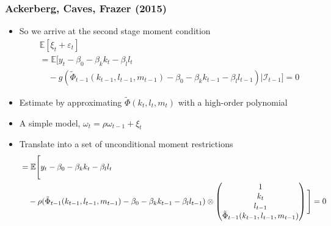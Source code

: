 \documentclass{beamer}
\begin{document}
\begin{frame}
\frametitle{Ackerberg, Caves, Frazer (2015)}
\begin{itemize}
	\item So we arrive at the second stage moment condition
	\begin{equation}
		\begin{split}
			&\mathbb{E}[\xi_{t}+\varepsilon_{t}]\\
			&=\mathbb{E}[y_{t}-\beta_{0}-\beta_{k}k_{t}-\beta_{l}l_{t}\\
			& \quad -g(\tilde{\Phi}_{t-1}(k_{t-1}, l_{t-1}, m_{t-1})-\beta_{0}-\beta_{k}k_{t-1}-\beta_{l}l_{t-1})|\mathcal{I}_{t-1}]=0
		\end{split}
	\end{equation}
	\item Estimate by approximating $\tilde{\Phi}(k_{t}, l_{t}, m_{t})$ with a high-order polynomial
	\item A simple model, $\omega_{t}=\rho \omega_{t-1}+\xi_{t}$
	\item Translate into a set of unconditional moment restrictions
	\scriptsize
	\begin{equation}
		\begin{split}
			&=\mathbb{E}\Bigg[y_{t}-\beta_{0}-\beta_{k}k_{t}-\beta_{l}l_{t}\\
			& \quad -\rho(\tilde{\Phi}_{t-1}(k_{t-1}, l_{t-1}, m_{t-1})-\beta_{0}-\beta_{k}k_{t-1}-\beta_{l}l_{t-1})\otimes
			\begin{pmatrix}
			1\\
			k_{t}\\
			l_{t-1}\\
			\tilde{\Phi}_{t-1}(k_{t-1}, l_{t-1}, m_{t-1})
			\end{pmatrix}\Bigg]=0
			\normalsize
		\end{split}
	\end{equation}
\end{itemize}
\end{frame}


\end{document}
